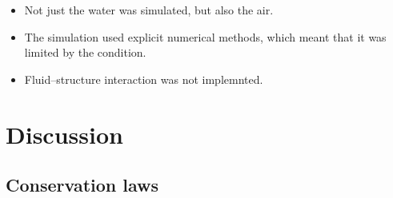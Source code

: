 \begin{itemize}
\end{itemize}

\HRule

\begin{itemize}
    \item Not just the water was simulated, but also the air. %
    
    \item The simulation used explicit numerical methods, which meant that it was limited by the \CFL condition. %
    
    \item Fluid--structure interaction was not implemnted. %
\end{itemize}


\HRule

\chapter{Discussion}

\section{Conservation laws}

